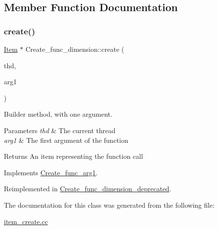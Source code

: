 \subsection{Member Function Documentation}
\mbox{\label{classCreate__func__dimension_a0bb53cc401570127d5ad15c5eb801f39}} 
\subsubsection{\texorpdfstring{create()}{create()}}
{\footnotesize\ttfamily \mbox{\hyperlink{classItem}{Item}} $\ast$ Create\+\_\+func\+\_\+dimension\+::create (\begin{DoxyParamCaption}\item[{T\+HD $\ast$}]{thd,  }\item[{\mbox{\hyperlink{classItem}{Item}} $\ast$}]{arg1 }\end{DoxyParamCaption})\hspace{0.3cm}{\ttfamily [virtual]}}

Builder method, with one argument. 
\begin{DoxyParams}{Parameters}
{\em thd} & The current thread \\
\hline
{\em arg1} & The first argument of the function \\
\hline
\end{DoxyParams}
\begin{DoxyReturn}{Returns}
An item representing the function call 
\end{DoxyReturn}


Implements \mbox{\hyperlink{classCreate__func__arg1_a3e9a98f755cd82c3e762e334c955a8c9}{Create\+\_\+func\+\_\+arg1}}.



Reimplemented in \mbox{\hyperlink{classCreate__func__dimension__deprecated_af75eca8b756e87b951297f98a20017c6}{Create\+\_\+func\+\_\+dimension\+\_\+deprecated}}.



The documentation for this class was generated from the following file\+:\begin{DoxyCompactItemize}
\item 
\mbox{\hyperlink{item__create_8cc}{item\+\_\+create.\+cc}}\end{DoxyCompactItemize}
